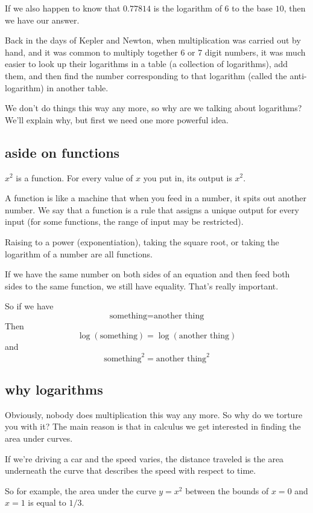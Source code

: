 \documentclass[11pt, oneside]{article}
\begin{document}
If we also happen to know that $0.77814$ is the logarithm of $6$ to the base $10$, then we have our answer.

Back in the days of Kepler and Newton, when multiplication was carried out by hand, and it was common to multiply together 6 or 7 digit numbers, it was much easier to look up their logarithms in a table (a collection of logarithms), add them, and then find the number corresponding to that logarithm (called the anti-logarithm) in another table.  

We don't do things this way any more, so why are we talking about logarithms?  We'll explain why, but first we need one more powerful idea.

\subsection*{aside on functions}
$x^2$ is a function.  For every value of $x$ you put in, its output is $x^2$.

A function is like a machine that when you feed in a number, it spits out another number.  We say that a function is a rule that assigns a unique output for every input (for some functions, the range of input may be restricted).

Raising to a power (exponentiation), taking the square root, or taking the logarithm of a number are all functions.

If we have the same number on both sides of an equation and then feed both sides to the same function, we still have equality.  That's really important.

So if we have
\[ \text{something} = \text{another thing} \]
Then
\[ \log(\text{something}) = \log(\text{another thing}) \]
and
\[ \text{something}^2 = \text{another thing}^2 \]

\subsection*{why logarithms}

Obviously, nobody does multiplication this way any more. So why do we torture you with it?  The main reason is that in calculus we get interested in finding the area under curves.  

If we're driving a car and the speed varies, the distance traveled is the area underneath the curve that describes the speed with respect to time.

So for example, the area under the curve $y = x^2$ between the bounds of $x = 0$ and $x = 1$ is equal to $1/3$.
\end{document}
